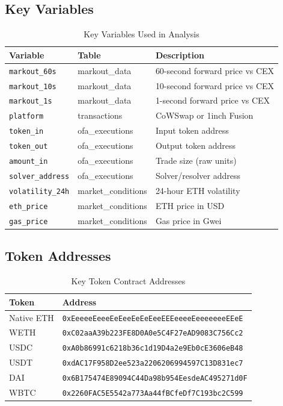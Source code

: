 \documentclass[11pt,a4paper]{article}
\begin{document}
\subsection{Key Variables}

\begin{table}[H]
\centering
\caption{Key Variables Used in Analysis}
\begin{tabular}{lll}
\toprule
\textbf{Variable} & \textbf{Table} & \textbf{Description} \\
\midrule
\texttt{markout\_60s} & markout\_data & 60-second forward price vs CEX \\
\texttt{markout\_10s} & markout\_data & 10-second forward price vs CEX \\
\texttt{markout\_1s} & markout\_data & 1-second forward price vs CEX \\
\texttt{platform} & transactions & CoWSwap or 1inch Fusion \\
\texttt{token\_in} & ofa\_executions & Input token address \\
\texttt{token\_out} & ofa\_executions & Output token address \\
\texttt{amount\_in} & ofa\_executions & Trade size (raw units) \\
\texttt{solver\_address} & ofa\_executions & Solver/resolver address \\
\texttt{volatility\_24h} & market\_conditions & 24-hour ETH volatility \\
\texttt{eth\_price} & market\_conditions & ETH price in USD \\
\texttt{gas\_price} & market\_conditions & Gas price in Gwei \\
\bottomrule
\end{tabular}
\end{table}

\subsection{Token Addresses}

\begin{table}[H]
\centering
\caption{Key Token Contract Addresses}
\begin{tabular}{ll}
\toprule
\textbf{Token} & \textbf{Address} \\
\midrule
Native ETH & \texttt{0xEeeeeEeeeEeEeeEeEeEeeEEEeeeeEeeeeeeeEEeE} \\
WETH & \texttt{0xC02aaA39b223FE8D0A0e5C4F27eAD9083C756Cc2} \\
USDC & \texttt{0xA0b86991c6218b36c1d19D4a2e9Eb0cE3606eB48} \\
USDT & \texttt{0xdAC17F958D2ee523a2206206994597C13D831ec7} \\
DAI & \texttt{0x6B175474E89094C44Da98b954EesdeAC495271d0F} \\
WBTC & \texttt{0x2260FAC5E5542a773Aa44fBCfeDf7C193bc2C599} \\
\bottomrule
\end{tabular}
\end{table}
\end{document}
